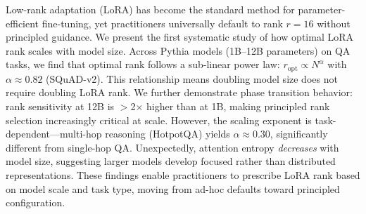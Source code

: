 Low-rank adaptation (LoRA) has become the standard method for parameter-efficient fine-tuning, yet practitioners universally default to rank $r=16$ without principled guidance. We present the first systematic study of how optimal LoRA rank scales with model size. Across Pythia models (1B--12B parameters) on QA tasks, we find that optimal rank follows a sub-linear power law: $r_{\text{opt}} \propto N^\alpha$ with $\alpha \approx 0.82$ (SQuAD-v2). This relationship means doubling model size does not require doubling LoRA rank. We further demonstrate phase transition behavior: rank sensitivity at 12B is $>$2$\times$ higher than at 1B, making principled rank selection increasingly critical at scale. However, the scaling exponent is task-dependent---multi-hop reasoning (HotpotQA) yields $\alpha \approx 0.30$, significantly different from single-hop QA. Unexpectedly, attention entropy \emph{decreases} with model size, suggesting larger models develop focused rather than distributed representations. These findings enable practitioners to prescribe LoRA rank based on model scale and task type, moving from ad-hoc defaults toward principled configuration.
